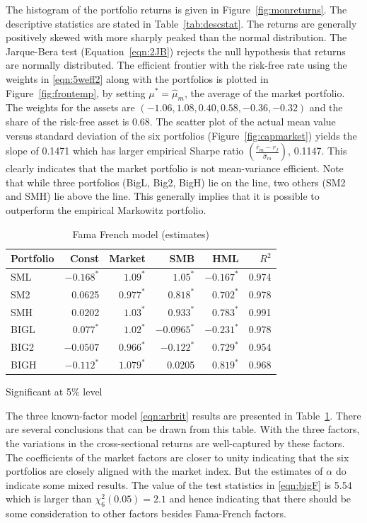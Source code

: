 The histogram of the portfolio returns is given in Figure~\ref{fig:monreturns}. The descriptive statistics are stated in Table~\ref{tab:descstat}. The returns are generally positively skewed with more sharply peaked than the normal distribution. The Jarque-Bera test (Equation~\ref{eqn:2JB}) rejects the null hypothesis that returns are normally distributed. The efficient frontier with the risk-free rate using the weights in \eqref{eqn:5weff2} along with the portfolios is plotted in Figure~\ref{fig:frontemp}, by setting $\mu^*= \hat{\mu}_m$, the average of the market portfolio. The weights for the assets are $(-1.06, 1.08, 0.40, 0.58, -0.36, -0.32)$ and the share of the risk-free asset is 0.68. The scatter plot of the actual mean value versus standard deviation of the six portfolios (Figure~\ref{fig:capmarket}) yields the slope of 0.1471 which has larger empirical Sharpe ratio $\left( \frac{\overline{r}_m - r_f}{\hat{\sigma}_m} \right)$, 0.1147. This clearly indicates that the market portfolio is not mean-variance efficient. Note that while three portfolios (BigL, Big2, BigH) lie on the line, two others (SM2 and SMH) lie above the line. This generally implies that it is possible to outperform the empirical Markowitz portfolio. 

        \begin{table}
        \centering
        \caption{Fama French model (estimates)\label{tab:famafrenchmodel}}
        \begin{tabular}{lrrrrr}
        Portfolio & Const & Market & SMB & HML & $R^2$ \\ \hline
        SML & $-0.168^*$ & $1.09^*$ & $1.05^*$ & $-0.167^*$ & 0.974 \\
        SM2 & 0.0625 & $0.977^*$ & $0.818^*$ & $0.702^*$ & 0.978 \\
        SMH & 0.0202 & $1.03^*$ & $0.933^*$ & $0.783^*$ & 0.991 \\
        BIGL & $0.077^*$ & $1.02^*$ & $-0.0965^*$ & $-0.231^*$ & 0.978 \\
        BIG2 & $-0.0507$ & $0.966^*$ & $-0.122^*$ & $0.729^*$ & 0.954 \\
        BIGH & $-0.112^*$ & $1.079^*$ & 0.0205 & $0.819^*$ & 0.968
        \end{tabular}
        {\small*Significant at 5\% level}
        \end{table}


The three known-factor model \eqref{eqn:arbrit} results are presented in Table~\ref{tab:famafrenchmodel}. There are several conclusions that can be drawn from this table. With the three factors, the variations in the cross-sectional returns are well-captured by these factors. The coefficients of the market factors are closer to unity indicating that the six portfolios are closely aligned with the market index. But the estimates of $\alpha$ do indicate some mixed results. The value of the test statistics in \eqref{eqn:bigF} is 5.54 which is larger than $\chi_6^2 (0.05)= 2.1$ and hence indicating that there should be some consideration to other factors besides Fama-French factors.


